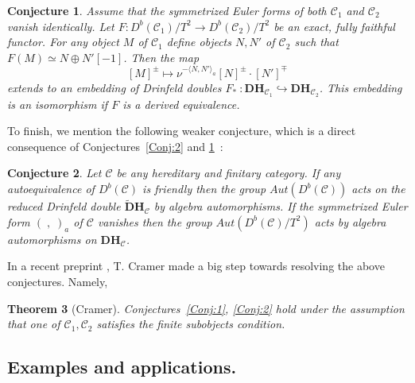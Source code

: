 \documentclass[a4paper,10pt]{amsart}
\def\H{\mathbf{H}}
\newtheorem{theo}{\bf{Theorem}}[section]
\newtheorem{conj}[theo]{Conjecture}
\numberwithin{equation}{section}
\begin{document}
{\vspace{.1in}

\begin{conj}\label{Conj:3} Assume that the symmetrized Euler forms of both $\mathcal{C}_1$ and $\mathcal{C}_2$ vanish identically.  Let $F: D^b(\mathcal{C}_1)/T^2 \to D^b(\mathcal{C}_2)/T^2$ be an exact, fully faithful functor. For any object $M$ of $\mathcal{C}_1$ define objects $N,N'$ of $\mathcal{C}_2$ such that $F(M) \simeq N \oplus N'[-1]$. Then the map
$$[M]^{\pm} \mapsto  \nu^{-\langle N,N'\rangle_a}[N]^{\pm} \cdot [N']^{\mp}$$
extends to an embedding of Drinfeld doubles $F_*~: {\mathbf{D}}\H_{\mathcal{C}_1} \hookrightarrow {\mathbf{D}}\H_{\mathcal{C}_2}$. This embedding is an isomorphism if $F$ is a derived equivalence.\end{conj}

\vspace{.1in}

To finish, we mention the following weaker conjecture, which is a direct consequence of Conjectures~\ref{Conj:2} and \ref{Conj:3}~:

\vspace{.1in}

\begin{conj}\label{Conj:4} Let $\mathcal{C}$ be any hereditary and finitary category. If any autoequivalence of $D^b(\mathcal{C})$ is friendly then the group $Aut(D^b(\mathcal{C}))$ acts on the reduced Drinfeld double $\widetilde{\mathbf{D}}\H_{\mathcal{C}}$ by algebra automorphisms. If the symmetrized Euler form $(\;,\;)_a$ of $\mathcal{C}$ vanishes then the group $Aut(D^b(\mathcal{C})/T^2)$ acts by algebra automorphisms on ${\mathbf{D}}\H_{\mathcal{C}}$.
\end{conj}

\vspace{.1in}

In a recent preprint \cite{Cramer}, T. Cramer made a big step towards resolving the above conjectures. Namely,

\vspace{.1in}

\begin{theo}[Cramer]
Conjectures~\ref{Conj:1}, \ref{Conj:2} hold under the assumption that one of $\mathcal{C}_1, \mathcal{C}_2$ satisfies the finite subobjects condition.
\end{theo}

\vspace{.2in}

\subsection{Examples and applications.}

}
\end{document}
